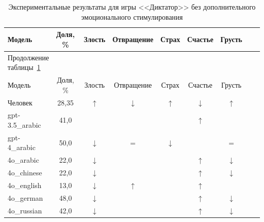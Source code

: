 \begin{longtable}[c]{|p{3.2cm}|c|c|c|c|c|c|c|c|}
    \caption{Экспериментальные результаты для игры <<Диктатор>> без дополнительного эмоционального стимулирования}
    \label{tab:multlag-no-prompt}
    \\
    \hline
Модель & Доля, \% & Злость & Отвращение & Страх  & Счастье & Грусть \\ \hline
    \endfirsthead   
    \multicolumn{2}{l}{\hspace{-2mm}Продолжение таблицы~\ref{tab:multlag-no-prompt}}        \\ %
\hline

Модель & Доля, \% & Злость & Отвращение & Страх  & Счастье & Грусть \\ \hline \endhead        \hline %
    \endfoot        \hline
    \endlastfoot
Человек        & 28,35  & $\uparrow$ & $\downarrow$ & $\uparrow$ & $\downarrow$ & $\uparrow$ \\  
\hline
gpt-3.5\_arabic & 41,0 & \bluearrow{$\uparrow$} & \bluearrow{$\downarrow$} & \bluearrow{$\uparrow$} & $\uparrow$ & \bluearrow{$\uparrow $}\\
\hline
gpt-4\_arabic & 50,0 & $\downarrow$ & $=$ & $\downarrow$ & \bluearrow{$\downarrow$} & $= $\\
\hline
4o\_arabic & 22,0 & $\downarrow$ & \bluearrow{$\downarrow$} & \bluearrow{$\uparrow$} & $\uparrow$ & $\downarrow $\\
\hline
4o\_chinese & 22,0 & $\downarrow$ & \bluearrow{$\downarrow$} & \bluearrow{$\uparrow$} & $\uparrow$ & $\downarrow $\\
\hline
4o\_english & 13,0 & $\downarrow$ & $\uparrow$ & \bluearrow{$\uparrow$} & $\uparrow$ & \bluearrow{$\uparrow $}\\
\hline
4o\_german & 48,0 & $\downarrow$ & \bluearrow{$\downarrow$} & \bluearrow{$\uparrow$} & $\uparrow$ & $\downarrow $\\
\hline
4o\_russian & 42,0 & $\downarrow$ & \bluearrow{$\downarrow$} & \bluearrow{$\uparrow$} & $\uparrow$ & $\downarrow $\\

\end{longtable}
